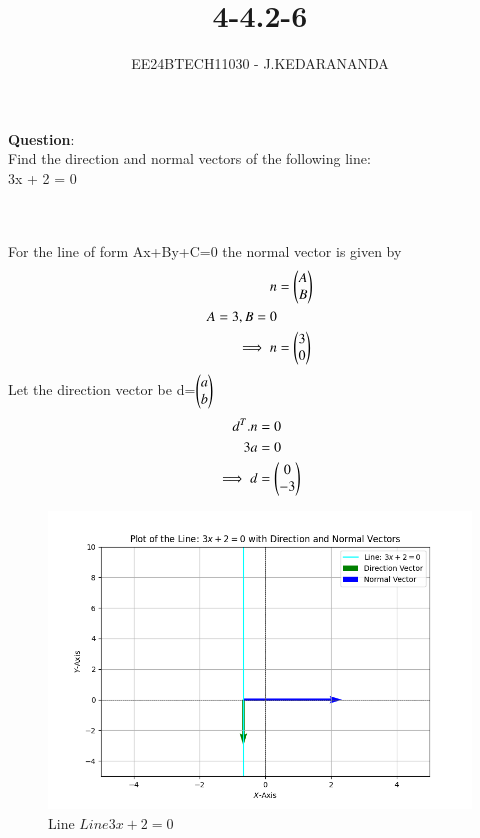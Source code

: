 \documentclass[journal]{IEEEtran}
\numberwithin{equation}{enumi}
\numberwithin{figure}{enumi}
\begin{document}

\title{4-4.2-6}
\author{EE24BTECH11030 - J.KEDARANANDA}
{\let\newpage\relax\maketitle}
\textbf{Question}:\\
Find the direction and normal vectors of the following line:\\
3x + 2 = 0
\\
\solution \\
\begin{table}[h!]
  \centering
  
  \caption{}
  \label{tabQuestion-4-4.2-6}
\end{table}\\
For the line of form Ax+By+C=0 the normal vector is given by
\begin{align}
    n&=\begin{pmatrix}A\\B\end{pmatrix}\\
    A=3,B=0\\
    \implies n&=\begin{pmatrix}3\\0\end{pmatrix}
\end{align}
Let the direction vector be d=$\begin{pmatrix}a\\b\end{pmatrix}$
\begin{align}
    d^T.n&=0\\
    3a&=0\\
    \implies d&=\begin{pmatrix}0\\-3\end{pmatrix}
\end{align}
\begin{figure}[h!]
    \centering
    \includegraphics[width=\linewidth]{figs/fig1.png}
    \caption{ Line $Line 3x + 2 = 0$}
\end{figure}
\end{document}
